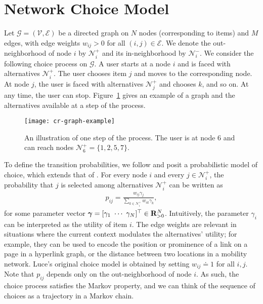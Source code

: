 \section{Network Choice Model}  %
\label{cr:sec:model}

Let $\mathcal{G} = (\mathcal{V}, \mathcal{E})$ be a directed graph on $N$ nodes (corresponding to items) and $M$ edges, with edge weights $w_{ij} > 0$ for all $(i, j) \in \mathcal{E}$.
We denote the out-neighborhood of node $i$ by $\mathcal{N}^+_i$ and its in-neighborhood by $\mathcal{N}^-_i$.
We consider the following choice process on $\mathcal{G}$.
A user starts at a node $i$ and is faced with alternatives $\mathcal{N}^+_i$.
The user chooses item $j$ and moves to the corresponding node.
At node $j$, the user is faced with alternatives $\mathcal{N}^+_j$ and chooses $k$, and so on.
At any time, the user can stop.
Figure~\ref{cr:fig:samplenet} gives an example of a graph and the alternatives available at a step of the process.

\begin{figure}
  \centering
  \texttt{[image: cr-graph-example]}
  \caption{An illustration of one step of the process.
  The user is at node 6 and can reach nodes $\mathcal{N}^+_6 = \{1, 2, 5, 7\}$.}
  \label{cr:fig:samplenet}
\end{figure}

To define the transition probabilities, we follow \citet{kumar2015inverting} and posit a probabilistic model of choice, which extends that of \citet{luce1959individual}.
For every node $i$ and every $j \in \mathcal{N}^+_i$, the probability that $j$ is selected among alternatives $\mathcal{N}^+_i$ can be written as
\begin{align}
\label{cr:eq:singlelik}
p_{ij} = \frac{w_{ij} \gamma_j}{\sum_{k \in \mathcal{N}^+_i} w_{ik} \gamma_k},
\end{align}
for some parameter vector $\bm{\gamma} = [\gamma_1 \ \cdots \ \gamma_N]^\Tr \in \mathbf{R}_{>0}^N$.
Intuitively, the parameter $\gamma_i$ can be interpreted as the utility of item $i$.
The edge weights are relevant in situations where the current context modulates the alternatives' utility;
for example, they can be used to encode the position or prominence of a link on a page in a hyperlink graph, or the distance between two locations in a mobility network.
Luce's original choice model is obtained by setting $w_{ij} \doteq 1$ for all $i, j$.
Note that $p_{ij}$ depends only on the out-neighborhood of node $i$.
As such, the choice process satisfies the Markov property, and we can think of the sequence of choices as a trajectory in a Markov chain.

